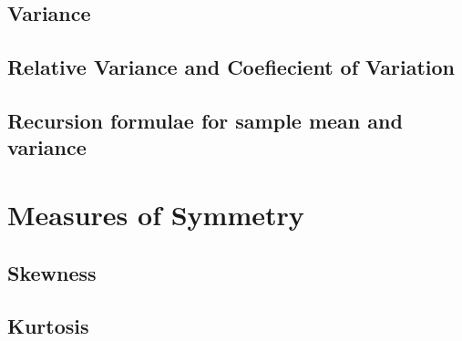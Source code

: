 \documentclass[12pt,a4paper]{article}
\begin{document}
\subsection{Variance}
\subsection{Relative Variance and Coefiecient of Variation}
\subsection{Recursion formulae for sample mean and variance}


\section{Measures of Symmetry}
\subsection{Skewness}
\subsection{Kurtosis}
\end{document}
